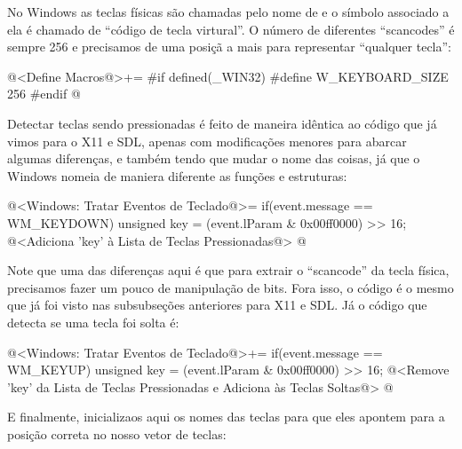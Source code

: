 
No Windows as teclas físicas são chamadas pelo nome
de  e o símbolo associado a ela é chamado de
``código de tecla virtural''. O número de diferentes ``scancodes'' é
sempre 256 e precisamos de uma posiçã a mais para representar ``qualquer
tecla'':

\iniciocodigo
@<Define Macros@>+=
#if defined(_WIN32)
#define W_KEYBOARD_SIZE 256
#endif
@
\fimcodigo

Detectar teclas sendo pressionadas é feito de maneira idêntica ao
código que já vimos para o X11 e SDL, apenas com modificações menores
para abarcar algumas diferenças, e também tendo que mudar o nome das
coisas, já que o Windows nomeia de maniera diferente as funções e
estruturas:

\iniciocodigo
@<Windows: Tratar Eventos de Teclado@>=
if(event.message == WM_KEYDOWN){
  unsigned key = (event.lParam & 0x00ff0000) >> 16;
  @<Adiciona 'key' à Lista de Teclas Pressionadas@>
}
@
\fimcodigo

Note que uma das diferenças aqui é que para extrair o ``scancode'' da
tecla física, precisamos fazer um pouco de manipulação de bits. Fora
isso, o código é o mesmo que já foi visto nas subsubseções anteriores
para X11 e SDL. Já o código que detecta se uma tecla foi solta é:

\iniciocodigo
@<Windows: Tratar Eventos de Teclado@>+=
if(event.message == WM_KEYUP){
  unsigned key = (event.lParam & 0x00ff0000) >> 16;
  @<Remove 'key' da Lista de Teclas Pressionadas e Adiciona às Teclas Soltas@>
}
@
\fimcodigo

E finalmente, inicializaos aqui os nomes das teclas para que eles
apontem para a posição correta no nosso vetor de teclas:

